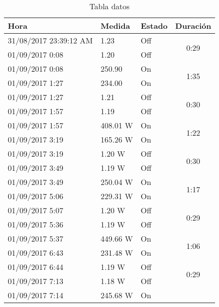 \begin{table}[H]
	\centering
	\begin{tabular}{|l|l|l|c|}
		\hline
		Hora                     & Medida   & Estado & \multicolumn{1}{l|}{Duración} \\ \hline \hline
		31/08/2017  23:39:12  AM & 1.23     & Off    & \multirow{2}{*}{0:29}         \\ \cline{1-3}
		01/09/2017 0:08          & 1.20     & Off    &                               \\ \hline
		01/09/2017 0:08          & 250.90   & On     & \multirow{2}{*}{1:35}         \\ \cline{1-3}
		01/09/2017 1:27          & 234.00   & On     &                               \\ \hline
		01/09/2017 1:27          & 1.21     & Off    & \multirow{2}{*}{0:30}         \\ \cline{1-3}
		01/09/2017 1:57          & 1.19     & Off    &                               \\ \hline
		01/09/2017 1:57          & 408.01 W & On     & \multirow{2}{*}{1:22}         \\ \cline{1-3}
		01/09/2017 3:19          & 165.26 W & On     &                               \\ \hline
		01/09/2017 3:19          & 1.20 W   & Off    & \multirow{2}{*}{0:30}         \\ \cline{1-3}
		01/09/2017 3:49          & 1.19 W   & Off    &                               \\ \hline
		01/09/2017 3:49          & 250.04 W & On     & \multirow{2}{*}{1:17}         \\ \cline{1-3}
		01/09/2017 5:06          & 229.31 W & On     &                               \\ \hline
		01/09/2017 5:07          & 1.20 W   & Off    & \multirow{2}{*}{0:29}         \\ \cline{1-3}
		01/09/2017 5:36          & 1.19 W   & Off    &                               \\ \hline
		01/09/2017 5:37          & 449.66 W & On     & \multirow{2}{*}{1:06}         \\ \cline{1-3}
		01/09/2017 6:43          & 231.48 W & On     &                               \\ \hline
		01/09/2017 6:44          & 1.19 W   & Off    & \multirow{2}{*}{0:29}         \\ \cline{1-3}
		01/09/2017 7:13          & 1.18 W   & Off    &                               \\ \hline
		01/09/2017 7:14          & 245.68 W & On     & \multicolumn{1}{l|}{}         \\ \hline
	\end{tabular}

	\caption{Tabla datos}
\label{fig:datoscongelador}
\end{table}
